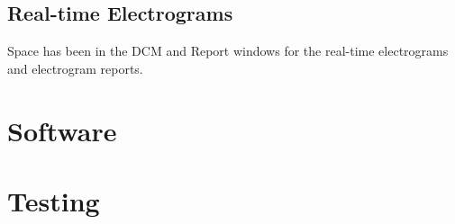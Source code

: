 \documentclass[12pt]{article}
\begin{document}
\subsection{Real-time Electrograms}
Space has been in the DCM and Report windows for the real-time electrograms and electrogram reports.


\newpage
\section{Software}
\subsection{}

\newpage
\section{Testing}
\subsection{}
\end{document}
